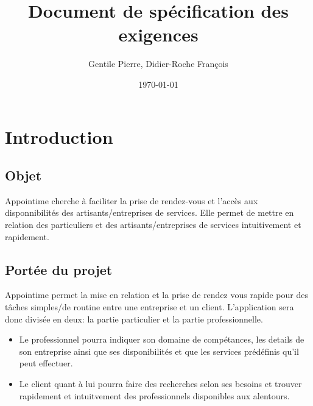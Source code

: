 \documentclass{article}
\author{Gentile Pierre, Didier-Roche François}
\date{\today}
\title{Document de spécification des exigences}
\begin{document}
\maketitle

\newpage
\tableofcontents
\newpage


\section{Introduction}
\subsection{Objet}
Appointime cherche à faciliter la prise de rendez-vous et l’accès aux disponnibilités des artisants/entreprises de services.
Elle permet de mettre en relation des particuliers et des artisants/entreprises de services intuitivement et rapidement.
\subsection{Portée du projet}
Appointime permet la mise en relation et la prise de rendez vous rapide pour des tâches simples/de routine entre une entreprise et un client.
L’application sera donc divisée en deux: la partie particulier et la partie professionnelle.
\begin{itemize}
\item Le professionnel pourra indiquer son domaine de compétances, les details de son entreprise ainsi que ses disponibilités
 et que les services prédéfinis qu’il peut effectuer.
\item Le client quant à lui pourra faire des recherches selon ses
  besoins et trouver rapidement et intuitvement des professionnels
  disponibles aux alentours.
\end{itemize}
\end{document}
